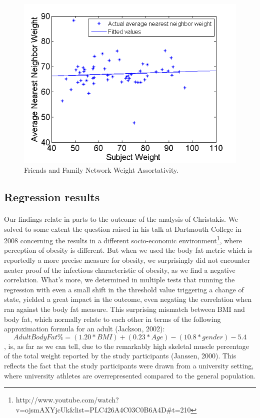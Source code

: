 \documentclass[11pt]{article}
\begin{document}
\begin{figure}[!h]
\center
   \includegraphics[scale=0.72]{weight_assortativity_figure3.png}
   \caption{\label{3} Friends and Family Network Weight Assortativity.}
\end{figure}


\subsection{Regression results}
\paragraph{}
Our findings relate in parts to the outcome of the analysis of Christakis. We solved to some extent the question raised in his talk at Dartmouth College in 2008 concerning the results in a different socio-economic environment\footnote{http://www.youtube.com/watch?v=ojsmAXYjcUk&list=PLC426A4C03C0B6A4D#t=210}, where perception of obesity is different. But when we used the body fat metric which is reportedly a more precise measure for obesity, we surprisingly did not encounter neater proof of the infectious characteristic of obesity, as we find a negative correlation. What's more, we determined in multiple tests that running the regression with even a small shift in the threshold value triggering a change of state, yielded a great impact in the outcome, even negating the correlation when ran against the body fat measure. This surprising mismatch between BMI and body fat, which normally relate to each other in terms of the following approximation formula for an adult (Jackson, 2002): 
\[Adult Body Fat \% = (1.20 * BMI) + (0.23 * Age) - (10.8 * gender) - 5.4\]
, is, as far as we can tell, due to the remarkably high skeletal muscle percentage of the total weight reported by the study participants (Janssen, 2000). This reflects the fact that the study participants were drawn from a university setting, where university athletes are overrepresented compared to the general population. 
\end{document}
